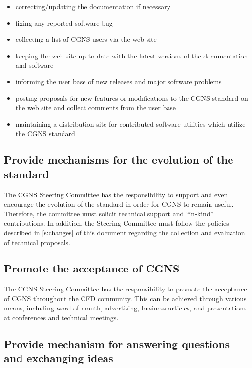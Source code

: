 \begin{itemize}
\item correcting/updating the documentation if necessary
\item fixing any reported software bug
\item collecting a list of CGNS users via the web site
\item keeping the web site up to date with the latest versions of the
      documentation and
      software
\item informing the user base of new releases and major software problems
\item posting proposals for
      new features or modifications to the CGNS standard on the web site
      and collect comments from the user base
\item maintaining a distribution site for
      contributed software
      utilities which utilize the CGNS standard
\end{itemize}

\subsection{Provide mechanisms for the evolution of the standard}
\label{s:evolution}

The CGNS Steering Committee has the responsibility to support and even
encourage the evolution of the standard in order for CGNS to remain
useful.
Therefore, the committee must solicit technical support and ``in-kind''
contributions.
In addition, the Steering Committee must follow the policies described
in \autoref{s:changes} of this document
regarding the collection and evaluation of technical
proposals.

\subsection{Promote the acceptance of CGNS}
\label{s:acceptance}

The CGNS Steering Committee has the responsibility to promote the
acceptance of CGNS throughout the CFD community.
This can be achieved through various means, including word of mouth,
advertising, business articles, and presentations at conferences and
technical meetings.

\subsection{Provide mechanism for answering questions and exchanging ideas}
\label{s:services}

